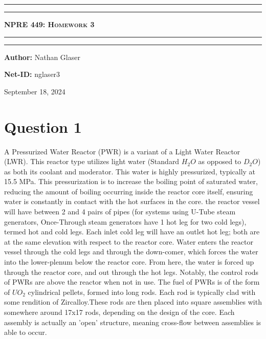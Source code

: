 \documentclass{article}
\begin{document}
\begin{titlepage}

\centering
\scshape
\vspace{\baselineskip}

%
\rule{\textwidth}{1.6pt}\vspace*{-\baselineskip}\vspace*{2pt}
\rule{\textwidth}{0.4pt}

{\Huge \textbf{\textsc{NPRE 449: Homework 3 \\
\vspace{15pt}}}}

\rule{\textwidth}{0.4pt}\vspace*{-\baselineskip}\vspace{3.2pt}
\rule{\textwidth}{1.6pt}\vspace{6pt}
\vspace{1.5\baselineskip}


\large \centerline{\textbf{Author:} Nathan Glaser}
\large \centerline{\textbf{Net-ID:} nglaser3}
\quad

\vfill
\large \centerline{September 18, 2024}
%
\end{titlepage}

\tableofcontents
\newpage
{}

\section*{Question 1}

A Pressurized Water Reactor (PWR) is a variant of a Light Water Reactor (LWR). This reactor type utilizes light water (Standard $H_2O$ as opposed to $D_2O$) as both its coolant and moderator. This water is highly pressurized, typically at 15.5 MPa. This pressurization is to increase the boiling point of saturated water, reducing the amount of boiling occurring inside the reactor core itself, ensuring water is constantly in contact with the hot surfaces in the core. the reactor vessel will have between 2 and 4 pairs of pipes (for systems using U-Tube steam generators, Once-Through steam generators have 1 hot leg for two cold legs), termed hot and cold legs. Each inlet cold leg will have an outlet hot leg; both are at the same elevation with respect to the reactor core. Water enters the reactor vessel through the cold legs and through the down-comer, which forces the water into the lower-plenum below the reactor core. From here, the water is forced up through the reactor core, and out through the hot legs. Notably, the control rods of PWRs are above the reactor when not in use. The fuel of PWRs is of the form of $UO_2$ cylindrical pellets, formed into long rods. Each rod is typically clad with some rendition of Zircalloy.These rods are then placed into square assemblies with somewhere around 17x17 rods, depending on the design of the core.  Each assembly is actually an 'open' structure, meaning cross-flow between assemblies is able to occur. 
\end{document}
